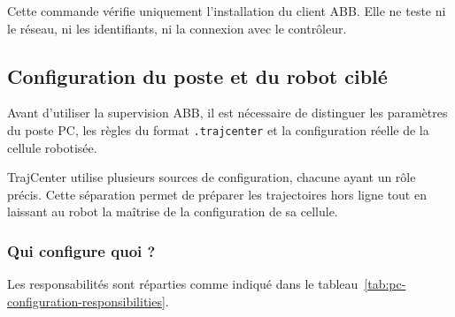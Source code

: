 \documentclass{rapportENSAM}
\begin{document}
Cette commande vérifie uniquement l'installation du client ABB. Elle ne teste
ni le réseau, ni les identifiants, ni la connexion avec le contrôleur.

\subsection{Configuration du poste et du robot ciblé}
\label{subsec:pc-configuration}

Avant d'utiliser la supervision ABB, il est nécessaire de distinguer les
paramètres du poste PC, les règles du format \texttt{.trajcenter} et la
configuration réelle de la cellule robotisée.

TrajCenter utilise plusieurs sources de configuration, chacune ayant un rôle
précis. Cette séparation permet de préparer les trajectoires hors ligne tout en
laissant au robot la maîtrise de la configuration de sa cellule.

\subsubsection{Qui configure quoi ?}
\label{subsubsec:pc-configuration-responsibilities}

Les responsabilités sont réparties comme indiqué dans le
tableau~\ref{tab:pc-configuration-responsibilities}.
\end{document}
